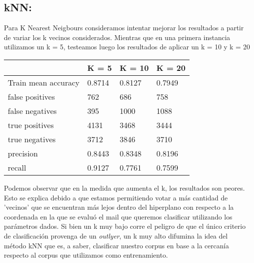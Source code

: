 \documentclass[10pt,a4paper]{article}
\begin{document}
\subsection{kNN:}

Para K Nearest Neigbours consideramos intentar mejorar los resultados a partir de variar los k vecinos considerados. Mientras que en una primera instancia utilizamos un k = 5, testeamos luego los resultados de aplicar un k = 10 y k = 20

\begin{table}[H]
	\centering
	\label{my-label}
	\begin{tabular}{|l|l|l|l|}
		\hline
		\multicolumn{1}{|c|}{\textbf{}} & \multicolumn{1}{c|}{\textbf{K = 5}} & \multicolumn{1}{c|}{\textbf{K = 10}} & \multicolumn{1}{c|}{\textbf{K = 20}} \\ \hline
		Train mean accuracy              & 0.8714                              & 0.8127                               & 0.7949                               \\ \hline
		false positives                 & 762                                 & 686                                  & 758                                  \\ \hline
		false negatives                 & 395                                 & 1000                                 & 1088                                 \\ \hline
		true positives                  & 4131                                & 3468                                 & 3444                                 \\ \hline
		true negatives                  & 3712                                & 3846                                 & 3710                                 \\ \hline
		precision                       & 0.8443                              & 0.8348                               & 0.8196                               \\ \hline
		recall                          & 0.9127                              & 0.7761                               & 0.7599                               \\ \hline
	\end{tabular}
\end{table}

Podemos observar que en la medida que aumenta el k, los resultados son peores. Esto se explica debido a que estamos permitiendo votar a más cantidad de 'vecinos' que se encuentran más lejos dentro del hiperplano con respecto a la coordenada en la que se evaluó el mail que queremos clasificar utilizando los parámetros dados. Si bien un k muy bajo corre el peligro de que el único criterio de clasificación provenga de un \textit{outlyer}, un k muy alto difumina la idea del método kNN que es, a saber, clasificar nuestro corpus en base a la cercanía respecto al corpus que utilizamos como entrenamiento.
\end{document}
